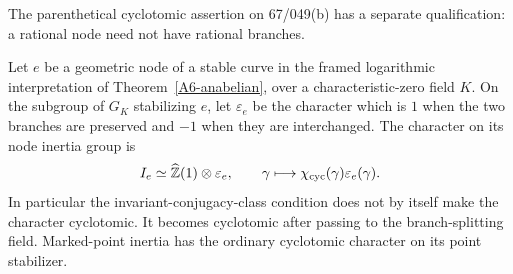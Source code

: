 The parenthetical cyclotomic assertion on 67/049(b) has a separate
qualification: a rational node need not have rational branches.

\begin{proposition}\label{A6-node-character}
Let $e$ be a geometric node of a stable curve in the framed logarithmic
interpretation of Theorem~\ref{A6-anabelian}, over a characteristic-zero
field $K$. On the subgroup of $G_K$ stabilizing $e$, let
$\varepsilon_e$ be the character which is $1$ when the two branches
are preserved and $-1$ when they are interchanged. The character on
its node inertia group is
\[
 I_e\simeq\widehat{{\mathbb{Z}}}(1)\otimes\varepsilon_e,
 \qquad \gamma\longmapsto\chi_{\rm cyc}(\gamma)\varepsilon_e(\gamma).
\]
In particular the invariant-conjugacy-class condition does not by
itself make the character cyclotomic. It becomes cyclotomic after
passing to the branch-splitting field. Marked-point inertia has the
ordinary cyclotomic character on its point stabilizer.
\end{proposition}

